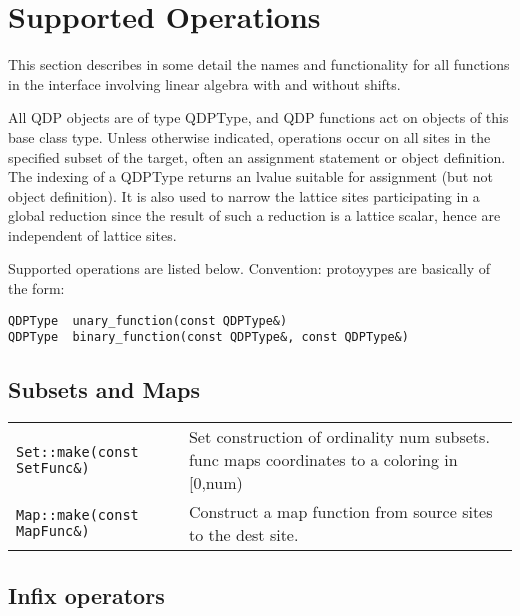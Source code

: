 \documentclass[12pt,letterpaper]{article}
\begin{document}
\section{Supported Operations}
\label{sec:supported}

This section describes in some detail the names and functionality for
all functions in the interface involving linear algebra with and
without shifts.  

All QDP objects are of type QDPType, and QDP functions act on objects
of this base class type. Unless otherwise indicated, operations occur
on all sites in the specified subset of the target, often an
assignment statement or object definition. The indexing of a QDPType
returns an lvalue suitable for assignment (but not object
definition). It is also used to narrow the lattice sites participating
in a global reduction since the result of such a reduction is a
lattice scalar, hence are independent of lattice sites.

Supported operations are listed below.
Convention: protoyypes are basically of the form:

\begin{verbatim}
QDPType  unary_function(const QDPType&)
QDPType  binary_function(const QDPType&, const QDPType&)
\end{verbatim}

\medskip

\subsection{Subsets and Maps}
\label{sec:subsets}

\begin{flushleft}
\begin{tabular}{lp{4.0in}}
{\tt Set::make(const SetFunc\&)} & Set construction of ordinality num subsets.
                               func maps coordinates to a coloring in [0,num)\\

{\tt Map::make(const MapFunc\&)} & Construct a map function from source sites to the dest site.\\
\end{tabular}
\end{flushleft}

\medskip

\subsection{Infix operators}
\label{sec:infix}
\end{document}
